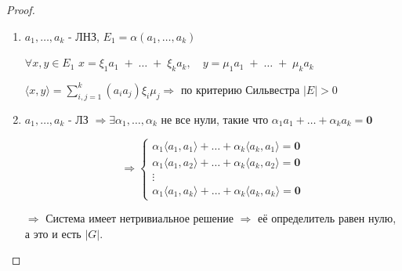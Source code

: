 \vspace{0.2cm}
\begin{proof}
\leavevmode \newline
    \begin{enumerate}
        \item ${a_{1}, \ldots, a_{k}}$ - ЛНЗ, \quad $E_{1} = \alpha(a_{1}, \ldots, a_{k})$ 
        \newline 
        
        $\forall x, y \in E_{1}$ \quad  $x = \xi_{1} a_{1} \; + \; \ldots \; + \; \xi_{k} a_{k}, \quad y = \mu_{1} a_{1} \; + \; \ldots \; + \; \mu_{k} a_{k}$ 
        \newline 
        
        $\langle x, y \rangle = \sum\limits_{i, j = 1}^{k} (a_{i} a_{j}) \xi_{i} \mu_{j} \Longrightarrow$ по критерию Сильвестра $|E| > 0$
        \newline 
        
        \item ${a_{1}, \ldots, a_{k}}$ - ЛЗ \; $\Longrightarrow \exists \alpha_{1}, \ldots, \alpha_{k}$ не все нули, такие что $\alpha_{1} a_{1} + \ldots + \alpha_{k} a_{k} = \boldsymbol{0}$
        \newline
        
        
    \[
    \Longrightarrow
        \begin{cases}
            \alpha_{1} \langle a_1, a_{1} \rangle + \ldots + \alpha_{k} \langle a_{k}, a_{1} \rangle = \mathbf{0} \\
            \alpha_{1} \langle a_{1}, a_{2} \rangle + \ldots + \alpha_{k} \langle a_{k}, a_{2} \rangle = \mathbf{0} \\
            \vdots \\
            
            \alpha_{1} \langle a_{1}, a_{k} \rangle + \ldots + \alpha_{k} \langle a_{k}, a_{k} \rangle = \mathbf{0}
        \end{cases}
    \]
    \newline
    
    $\Longrightarrow$ Система имеет нетривиальное решение $\Longrightarrow$ её определитель равен нулю, а это и есть $|G|.$
    \end{enumerate}
\end{proof}
